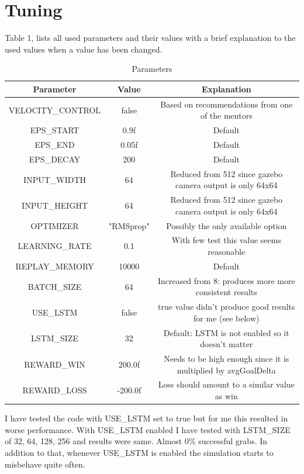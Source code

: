 \documentclass{article}
\begin{document}
\section{Tuning}

Table 1, lists all used parameters and their values with a brief explanation to the used values when a value has been changed.

\begin{table}[ht]
\caption{Parameters}
\label{table_example}
\begin{center}
\begin{tabular}{|c||c||c|}
\hline
Parameter & Value & Explanation\\
\hline
VELOCITY\_CONTROL & false & Based on recommendations from one of the mentors \\
\hline
EPS\_START & 0.9f & Default \\
\hline
EPS\_END & 0.05f & Default \\
\hline
EPS\_DECAY & 200 & Default \\
\hline
INPUT\_WIDTH & 64 & Reduced from 512 since gazebo camera output is only 64x64 \\
\hline
INPUT\_HEIGHT & 64 & Reduced from 512 since gazebo camera output is only 64x64 \\
\hline
OPTIMIZER & "RMSprop" & Possibly the only available option \\
\hline
LEARNING\_RATE & 0.1 & With few test this value seems reasonable \\
\hline
REPLAY\_MEMORY & 10000 & Default \\
\hline
BATCH\_SIZE & 64 & Increased from 8: produces more more consistent results \\
\hline
USE\_LSTM & false & true value didn't produce good results for me (see below) \\
\hline
LSTM\_SIZE & 32 & Default: LSTM is not enabled so it doesn't matter \\
\hline
REWARD\_WIN  & 200.0f & Needs to be high enough since it is multiplied by avgGoalDelta \\
\hline
REWARD\_LOSS & -200.0f & Loss should amount to a similar value as win \\
\hline
\end{tabular}
\end{center}
\end{table}

I have tested the code with USE\_LSTM set to true but for me this resulted in worse performance. With USE\_LSTM enabled I have tested with LSTM\_SIZE of 32, 64, 128, 256 and results were same. Almost 0\% successful grabs. In addition to that, whenever USE\_LSTM is enabled the simulation starts to misbehave quite often.
\end{document}
